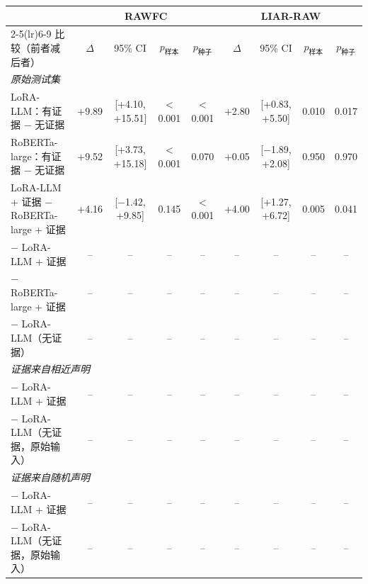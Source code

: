 \begin{tabular}{lcccccccc}
\toprule
 & \multicolumn{4}{c}{RAWFC} & \multicolumn{4}{c}{LIAR-RAW} \\
\cmidrule(lr){2-5}\cmidrule(lr){6-9}
比较（前者减后者） & $\Delta$ & 95\% CI & $p_{\text{样本}}$ & $p_{\text{种子}}$ & $\Delta$ & 95\% CI & $p_{\text{样本}}$ & $p_{\text{种子}}$ \\
\midrule
\multicolumn{9}{l}{\emph{原始测试集}} \\
LoRA-LLM：有证据 $-$ 无证据 & +9.89 & [+4.10, +15.51] & $<$0.001 & $<$0.001 & +2.80 & [+0.83, +5.50] & 0.010 & 0.017 \\
RoBERTa-large：有证据 $-$ 无证据 & +9.52 & [+3.73, +15.18] & $<$0.001 & 0.070 & +0.05 & [$-$1.89, +2.08] & 0.950 & 0.970 \\
LoRA-LLM + 证据 $-$ RoBERTa-large + 证据 & +4.16 & [$-$1.42, +9.85] & 0.145 & $<$0.001 & +4.00 & [+1.27, +6.72] & 0.005 & 0.041 \\
\ours{} $-$ LoRA-LLM + 证据 & -- & -- & -- & -- & -- & -- & -- & -- \\
\ours{} $-$ RoBERTa-large + 证据 & -- & -- & -- & -- & -- & -- & -- & -- \\
\ours{} $-$ LoRA-LLM（无证据） & -- & -- & -- & -- & -- & -- & -- & -- \\
\midrule
\multicolumn{9}{l}{\emph{证据来自相近声明}} \\
\ours{} $-$ LoRA-LLM + 证据 & -- & -- & -- & -- & -- & -- & -- & -- \\
\ours{} $-$ LoRA-LLM（无证据，原始输入） & -- & -- & -- & -- & -- & -- & -- & -- \\
\midrule
\multicolumn{9}{l}{\emph{证据来自随机声明}} \\
\ours{} $-$ LoRA-LLM + 证据 & -- & -- & -- & -- & -- & -- & -- & -- \\
\ours{} $-$ LoRA-LLM（无证据，原始输入） & -- & -- & -- & -- & -- & -- & -- & -- \\
\bottomrule
\end{tabular}
